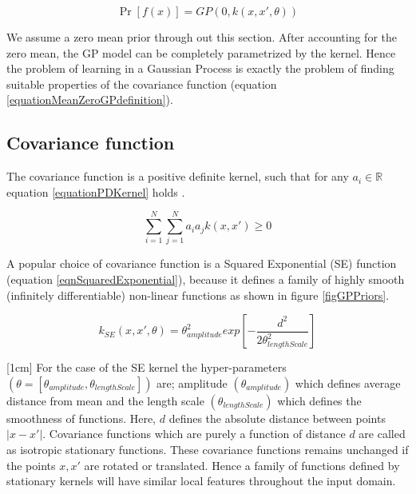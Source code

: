 \begin{equation}\label{equationMeanZeroGPdefinition}
\Pr[f(x)] = GP(0 , k(x, x', \theta))
\end{equation}

We assume a zero mean prior through out this section. After accounting for the zero mean, the GP model can be completely parametrized by the kernel. Hence the problem of learning in a Gaussian Process is exactly the problem of finding suitable properties of the covariance function \cite{rasmussen2006gaussian} (equation \ref{equationMeanZeroGPdefinition}). 


\subsection{Covariance function}\label{subSecCH2Covariance}
The covariance function is a positive definite kernel, such that for any \(a_{i} \in \mathbb{R}\) equation \ref{equationPDKernel} holds \cite{Stein1999Springer}.

\begin{equation}\label{equationPDKernel}
\sum_{i=1}^{N}\sum_{j=1}^{N}a_{i}a_{j}k(x,x') \geq 0
\end{equation}

A popular choice of covariance function is a Squared Exponential (SE) function (equation \ref{eqnSquaredExponential}), because it defines a family of highly smooth (infinitely differentiable) non-linear functions as shown in figure \ref{figGPPriors}.

\begin{equation}\label{eqnSquaredExponential}
k_{SE}(x, x', \theta) = \theta_{amplitude}^2exp[-\frac{d^2}{2\theta_{lengthScale}^2}]
\end{equation}

[1cm]
For the case of the SE kernel the hyper-parameters \((\theta = [\theta_{amplitude}, \theta_{lengthScale}])\) are; amplitude \((\theta_{amplitude})\) which defines average distance from mean and the length scale \((\theta_{lengthScale})\) which defines the smoothness of functions. Here, \(d\) defines the absolute distance between points \(|x-x'|\). Covariance functions which are purely a function of distance \(d\) are called as isotropic stationary functions. These covariance functions remains unchanged if the points \(x, x'\) are rotated or translated. Hence a family of functions defined by stationary kernels will have similar local features throughout the input domain. 

